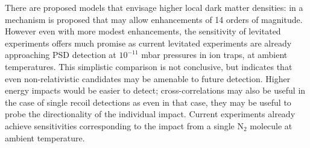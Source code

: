 \documentclass[twocolumn,english,notitlepage,superscriptaddress,nofootinbib]{revtex4-2}
\begin{document}
There are proposed models that envisage higher local dark matter densities: in   \cite{MilliCharges2023} a mechanism is proposed that may allow enhancements of 14 orders of magnitude. However even with more modest enhancements, the sensitivity of levitated experiments offers much promise as current levitated experiments are already approaching PSD detection at $10^{-11}$ mbar pressures in ion traps, at ambient temperatures. This simplistic comparison is not conclusive, but indicates that even non-relativistic candidates may be amenable to future detection. Higher energy impacts would be easier to detect;  cross-correlations may also be useful in the case of single recoil detections as even in that case, they may be useful to probe the directionality of the individual impact. Current experiments already achieve sensitivities corresponding to the impact from a single $\text{N}_2$ molecule at ambient temperature.

  
\end{document}
